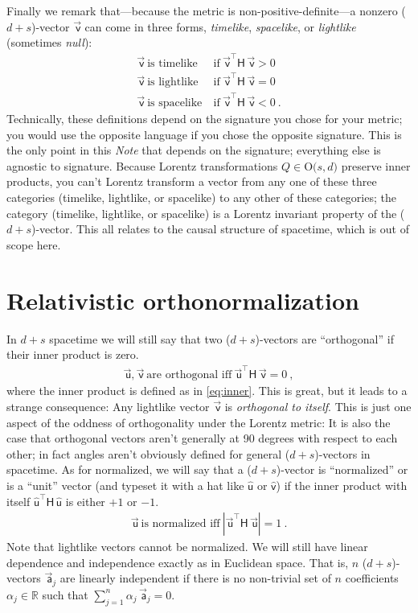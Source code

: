\documentclass{article}
\newcommand{\metric}{\mathsf{H}}
\newcommand\upvec[1]{\!\vec{\,\mathrm{#1}}}
\newcommand{\Lvec}[1]{\upvec{\mathsf{#1}}} %
\newcommand{\Lhat}[1]{\hat{\mathsf{#1}}} %
\newcommand{\plus}{\!+\!} %
\newcommand{\documentname}{\textsl{Note}}
\begin{document}
Finally we remark that---because the metric is non-positive-definite---a nonzero ($d\plus s$)-vector $\Lvec{v}$ can come in three forms, \emph{timelike}, \emph{spacelike}, or \emph{lightlike} (sometimes \emph{null}):
\begin{align}
    \Lvec{v} ~ \mbox{is timelike}  &~ \mbox{if} ~ \Lvec{v}^\top\metric\,\Lvec{v} > 0 \label{eq:timelike}\\
    \Lvec{v} ~ \mbox{is lightlike} &~ \mbox{if} ~ \Lvec{v}^\top\metric\,\Lvec{v} = 0 \label{eq:lightlike}\\
    \Lvec{v} ~ \mbox{is spacelike} &~ \mbox{if} ~ \Lvec{v}^\top\metric\,\Lvec{v} < 0 ~.\label{eq:spacelike}
\end{align}
Technically, these definitions depend on the signature you chose for your metric; you would use the opposite language if you chose the opposite signature.
This is the only point in this \documentname{} that depends on the signature; everything else is agnostic to signature.
Because Lorentz transformations $Q\in\mbox{O($s,d$)}$ preserve inner products, you can't Lorentz transform a vector from any one of these three categories (timelike, lightlike, or spacelike) to any other of these categories; the category (timelike, lightlike, or spacelike) is a Lorentz invariant property of the ($d\plus s$)-vector.
This all relates to the causal structure of spacetime, which is out of scope here.

\section{Relativistic orthonormalization}\label{sec:orth}

In $d\plus s$ spacetime we will still say that two ($d\plus s$)-vectors are ``orthogonal'' if their inner product is zero.
\begin{align}
    \Lvec{u},\Lvec{v} ~ \mbox{are orthogonal iff} ~ \Lvec{u}^\top\metric\,\Lvec{v}=0 ~,
\end{align}
where the inner product is defined as in \eqref{eq:inner}.
This is great, but it leads to a strange consequence:
Any lightlike vector $\Lvec{v}$ is \emph{orthogonal to itself}.
This is just one aspect of the oddness of orthogonality under the Lorentz metric:
It is also the case that orthogonal vectors aren't generally at 90 degrees with respect to each other; in fact angles aren't obviously defined for general ($d\plus s$)-vectors in spacetime.
As for normalized, we will say that a ($d\plus s$)-vector is ``normalized'' or is a ``unit'' vector (and typeset it with a hat like $\Lhat{u}$ or $\Lhat{v}$) if the inner product with itself $\Lhat{u}^\top\metric\,\Lhat{u}$ is either $+1$ or $-1$.
\begin{align}
    \Lvec{u} ~ \mbox{is normalized iff} ~ |\Lvec{u}^\top\metric\,\Lvec{u}| = 1 ~.
\end{align}
Note that lightlike vectors cannot be normalized. We will still have linear dependence and independence exactly as in Euclidean space.
That is, $n$ ($d\plus s$)-vectors $\Lvec{a}_j$ are linearly independent if there is no non-trivial set of $n$ coefficients $\alpha_j\in\mathbb{R}$ such that $\sum_{j=1}^n \alpha_j\,\Lvec{a}_j = 0$.
\end{document}
